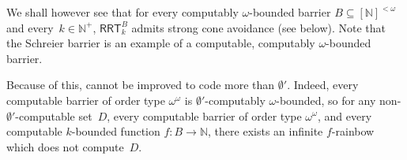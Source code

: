 \documentclass[10pt,a4paper]{article}
\newcommand{\RRT}[0]{\mathsf{RRT}}
\newcommand{\NN}[0]{\mathbb{N}}
\numberwithin{theorem}{section}
\begin{document}
We shall however see that for every computably $\omega$-bounded barrier $B \subseteq [\NN]^{<\omega}$ and every~$k \in \NN^+$, $\RRT^B_k$ admits strong cone avoidance (see below). Note that the Schreier barrier is an example of a computable, computably $\omega$-bounded barrier.

Because of this,  cannot be improved to code more than $\emptyset'$. Indeed, every computable barrier of order type $\omega^\omega$ is $\emptyset'$-computably $\omega$-bounded, so for any non-$\emptyset'$-computable set~$D$, every computable barrier of order type $\omega^\omega$, and every computable $k$-bounded function $f : B \to \NN$, there exists an infinite $f$-rainbow which does not compute~$D$.



\end{document}
